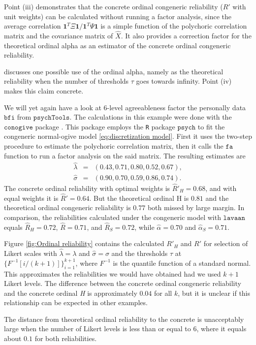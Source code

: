 \documentclass[twoside]{article}
\begin{document}
Point (iii) demonstrates that the concrete ordinal congeneric reliability ($ R'$ with unit weights) can be
calculated without running a factor analysis, since the average correlation
$\boldsymbol{1}^{T}\Xi\boldsymbol{1}/\boldsymbol{1}^{T}\Psi\boldsymbol{1}$ is a simple
function of the polychoric correlation matrix and the covariance matrix
of $\hat{X}.$ It also provides a correction factor for the theoretical ordinal alpha as an estimator of the concrete ordinal congeneric reliability.

\citet[p. 1068]{Chalmers2018-fj} discusses one possible use of the
ordinal alpha, namely as the theoretical reliability when the number
of thresholds $\tau$ goes towards infinity. Point (iv) makes this
claim concrete.

\begin{example}
We will yet again have a look at $6$-level agreeableness factor the
personally data $\mathtt{bfi}$ from $\mathtt{psychTools}$. The calculations in this example were done with the $\mathtt{conogive}$ package \citep{conogive}. This package employs the \texttt{R} package $\mathtt{psych}$ \citep{psych} to fit the congeneric normal-ogive
model \eqref{eq:discretization model}. First it uses the two-step procedure
to estimate the polychoric correlation matrix, then it calls the $\mathtt{fa}$ function to run a factor analysis on the said matrix.
The resulting estimates are 
\begin{eqnarray*}
\hat{\lambda} & = & (0.43,0.71,0.80,0.52,0.67),\\
\hat{\sigma} & = & (0.90,0.70,0.59,0.86,0.74).
\end{eqnarray*} The concrete ordinal reliability
with optimal weights is $\hat{R}'_{H}=0.68$, and with equal weights
it is $\hat{R}'=0.64$. But the theoretical ordinal H is $0.81$ 
and the theoretical ordinal congeneric reliability is $0.77$ both missed by large margin. In comparison, the
reliabilities calculated under the congeneric model with $\mathtt{lavaan}$ \citep{Rosseel2012-yg}
equals $\hat{R}_{H}=0.72$, $\hat{R}=0.71$, and $\hat{R}_S = 0.72$, while $\hat{\alpha} = 0.70$ and $\hat{\alpha}_S = 0.71$.

Figure \ref{fig:Ordinal reliability} contains the calculated $ R'_{H}$ and $ R'$ for selection of Likert
scales with $\hat{\lambda} = \lambda$ and $\hat{\sigma}=\sigma$ and
the thresholds $\tau$ at $\{F^{-1}[i/(k+1)]\}_{i=1}^{k+1}$, where $F^{-1}$ is the quantile function of a standard normal. This
approximates the reliabilities we would have obtained had we used
$k+1$ Likert levels. The difference between the concrete ordinal congeneric reliability and the concrete ordinal \textit{H} is approximately $0.04$ for all $k$, but it is unclear if this relationship can be expected in other examples.

The distance from theoretical ordinal reliability to the concrete is unacceptably large when the number of Likert levels is less than or equal to $6$, where it equals about $0.1$ for both reliabilities. 
\end{example}
\end{document}
